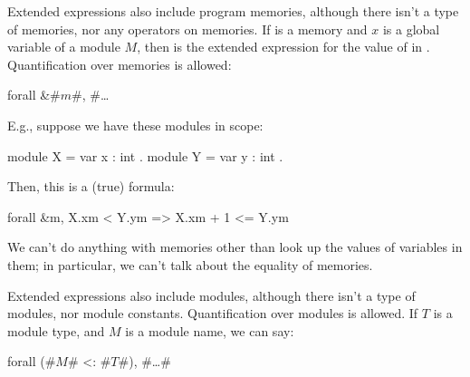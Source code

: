 Extended expressions also include program memories, although there
isn't a type of memories, nor any operators on memories.  If 
is a memory and $x$ is a global variable of a module $M$, then
 is the extended expression for the value of
 in .  Quantification over memories is allowed:
\begin{easycrypt}{}{}
forall &#$m$#, #\ldots
\end{easycrypt}
E.g., suppose we have these modules in scope:
\begin{easycrypt}{}{}
module X = { var x : int }.
module Y = { var y : int }.
\end{easycrypt}
Then, this is a (true) formula:
\begin{easycrypt}{}{}
forall &m, X.x{m} < Y.y{m} => X.x{m} + 1 <= Y.y{m}
\end{easycrypt}
We can't do anything with memories other than look up
the values of variables in them; in particular, we can't
talk about the equality of memories.

Extended expressions also include modules, although there isn't a type
of modules, nor module constants. Quantification over modules is
allowed. If $T$ is a module type, and $M$ is a module name, we can
say:
\begin{easycrypt}{}{}
forall (#$M$# <: #$T$#), #\ldots#
\end{easycrypt}
